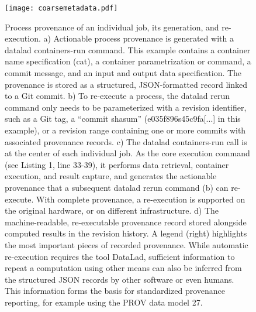 

\begin{figure}
	\centering
	\texttt{[image: coarsemetadata.pdf]}
	\caption[Process provenance of an individual job]{Process provenance of an individual job, its generation, and re-execution. a) Actionable process provenance is generated with a datalad containers-run command. This example contains a container name specification (cat), a container parametrization or command, a commit message, and an input and output data specification. The provenance is stored as a structured, JSON-formatted record linked to a Git commit. b) To re-execute a process, the datalad rerun command only needs to be parameterized with a revision identifier, such as a Git tag, a “commit shasum” (e035f896s45c9fa[...] in this example), or a revision range containing one or more commits with associated provenance records. c) The datalad containers-run call is at the center of each individual job. As the core execution command (see Listing 1, line 33-39), it performs data retrieval, container execution, and result capture, and generates the actionable provenance that a subsequent datalad rerun command (b) can re-execute. With complete provenance, a re-execution is supported on the original hardware, or on different infrastructure. d) The machine-readable, re-executable provenance record stored alongside computed results in the revision history. A legend (right) highlights the most important pieces of recorded provenance. While automatic re-execution requires the tool DataLad, sufficient information to repeat a computation using other means can also be inferred from the structured JSON records by other software or even humans. This information forms the basis for standardized provenance reporting, for example using the PROV data model 27.}
	\label{fig:fairly_metadata}
\end{figure}



